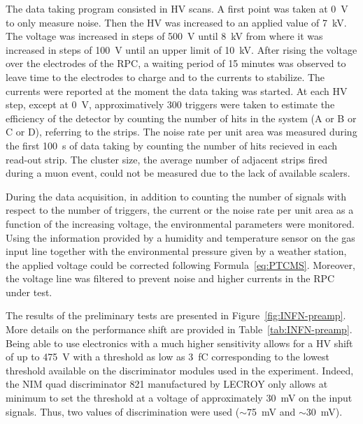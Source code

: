     The data taking program consisted in \acl{HV} scans. A first point was taken at \SI{0}{V} to only measure noise. Then the HV was increased to an applied value of \SI{7}{kV}. The voltage was increased in steps of \SI{500}{V} until \SI{8}{kV} from where it was increased in steps of \SI{100}{V} until an upper limit of \SI{10}{kV}. After rising the voltage over the electrodes of the RPC, a waiting period of 15 minutes was observed to leave time to the electrodes to charge and to the currents to stabilize. The currents were reported at the moment the data taking was started. At each HV step, except at \SI{0}{V}, approximatively 300 triggers were taken to estimate the efficiency of the detector by counting the number of hits in the system (A or B or C or D), referring to the strips. The noise rate per unit area was measured during the first \SI{100}{s} of data taking by counting the number of hits recieved in each read-out strip. The cluster size, the average number of adjacent strips fired during a muon event, could not be measured due to the lack of available scalers.
    
    During the data acquisition, in addition to counting the number of signals with respect to the number of triggers, the current or the noise rate per unit area as a function of the increasing voltage, the environmental parameters were monitored. Using the information provided by a humidity and temperature sensor on the gas input line together with the environmental pressure given by a weather station, the applied voltage could be corrected following Formula~\ref{eq:PTCMS}. Moreover, the voltage line was filtered to prevent noise and higher currents in the RPC under test.
    
    The results of the preliminary tests are presented in Figure~\ref{fig:INFN-preamp}. More details on the performance shift are provided in Table~\ref{tab:INFN-preamp}. Being able to use electronics with a much higher sensitivity allows for a HV shift of up to \SI{475}{V} with a threshold as low as \SI{3}{fC} corresponding to the lowest threshold available on the discriminator modules used in the experiment. Indeed, the NIM quad discriminator 821 manufactured by LECROY only allows at minimum to set the threshold at a voltage of approximately \SI{30}{mV} on the input signals. Thus, two values of discrimination were used ($\sim$\SI{75}{mV} and $\sim$\SI{30}{mV}).
	
